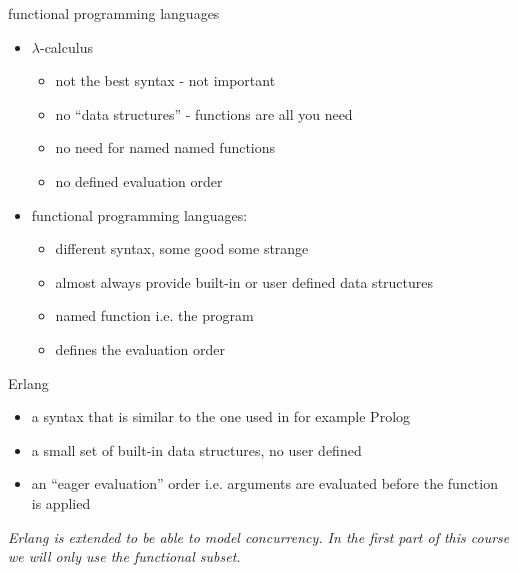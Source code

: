 \begin{frame}{functional programming languages}

 \begin{itemize}
   \pause\item $\lambda$-calculus
       \begin{itemize}        
          \pause \item not the best syntax - not important 
          \pause \item no ``data structures'' - functions are all you need 
          \pause \item no need for named named functions
          \pause \item no defined evaluation order  
       \end{itemize}   
    \pause\item functional programming languages: 
       \begin{itemize}        
            \pause \item different syntax, some good some strange 
            \pause \item almost always provide built-in or user defined data structures 
            \pause \item named function i.e. the program
            \pause \item defines the evaluation order
       \end{itemize}               
 \end{itemize}

\pause\vspace{10pt}{\em All functional programming languages have a core that can be expressed in $\lambda$-calculus.}

\end{frame}

\begin{frame}{Erlang}

 \begin{itemize}
    \pause \item a syntax that is similar to the one used in for example Prolog 

    \pause \item a small set of built-in data structures, no user defined 

    \pause \item an ``eager evaluation'' order i.e. arguments are evaluated before the function is applied 
 \end{itemize}

\pause\vspace{40pt}
{\em Erlang is extended to be able to model concurrency. In the first part of this course we will only use the functional subset.}

\end{frame}


